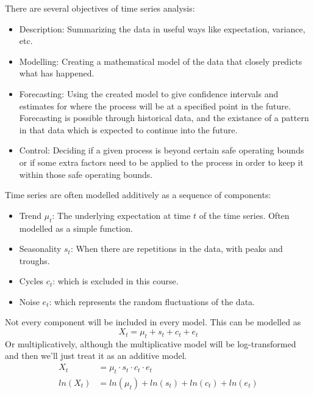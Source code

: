 \documentclass[12pt]{article}
\begin{document}
There are several objectives of time series analysis:
\begin{itemize} 
    \item Description: Summarizing the data in useful ways like expectation, variance, etc.
    \item Modelling: Creating a mathematical model of the data that closely predicts what has happened.
    \item Forecasting: Using the created model to give confidence intervals and estimates for where the process will be at a specified point in the future.  Forecasting is possible through historical data, and the existance of a pattern in that data which is expected to continue into the future.
    \item Control: Deciding if a given process is beyond certain safe operating bounds or if some extra factors need to be applied to the process in order to keep it within those safe operating bounds.
\end{itemize} 

Time series are often modelled additively as a sequence of components: 
\begin{itemize} 
    \item Trend \(\mu_t\): The underlying expectation at time \(t\) of the time series. Often modelled as a simple function.
    \item Seasonality \(s_t\): When there are repetitions in the data, with peaks and troughs.
    \item Cycles \(c_t\): which is excluded in this course.
    \item Noise \(e_t\): which represents the random fluctuations of the data.
\end{itemize} 
Not every component will be included in every model.
This can be modelled as 
\begin{equation*}
    X_t = \mu_t + s_t + c_t + e_t
\end{equation*}
Or multiplicatively, although the multiplicative model will be log-transformed and then we'll just treat it as an additive model.
\begin{equation*}
    \begin{aligned}
        X_t &= \mu_t \cdot s_t \cdot c_t \cdot e_t \\
        ln(X_t) &= ln(\mu_t) + ln(s_t) + ln(c_t) + ln(e_t) \\
    \end{aligned}
\end{equation*}
\end{document}
